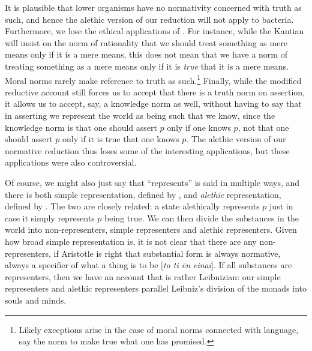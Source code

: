 It is plausible that lower organisms have no normativity concerned with truth as such, and hence the alethic
version  of our reduction will not apply to bacteria. Furthermore, we lose the ethical 
applications of . For instance, while the Kantian will insist on the norm of rationality
that we should treat something as mere means only if it is a mere means, this does not 
mean that we have a norm of treating something as a mere means only if it is \textit{true} that it is a mere
means. Moral norms rarely make reference to truth as such.\footnote{Likely exceptions arise in the case of
moral norms connected with language, say the norm to make true what one has promised.} Finally, while the modified reductive account still
forces us to accept that there is a truth norm on assertion, it allows us to accept, say, a knowledge norm as 
well, without having to say that in asserting we represent the world as being such that we know, since the 
knowledge norm is that one should assert $p$ only if one knows $p$, not that one should assert $p$ only if 
it is true that one knows $p$. 
The alethic version  of our normative reduction thus loses some of the interesting applications,
but these applications were also controversial. 

Of course, we might also just say that ``represents'' is said in multiple ways, and there is both simple representation,
defined by , and \textit{alethic} representation, defined by . The two are 
closely related: a state alethically represents $p$ just in case it simply represents $p$ being true. We can then
divide the substances in the world into non-representers, simple representers and alethic representers. Given how 
broad simple representation is, it is not clear that there are any non-representers, if Aristotle is right that
substantial form is always normative, always a specifier of what a thing is to be [\textit{to ti \=en einai}]. If 
all substances are representers, then we have 
an account that is rather Leibnizian: our simple representers and alethic representers parallel Leibniz's 
division of the monads into souls and minds. 

